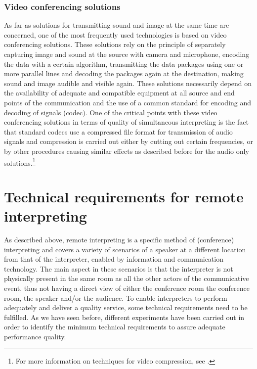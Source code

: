 \documentclass[output=paper]{langsci/langscibook}
\begin{document}
\subsubsection{Video conferencing solutions}
\label{sub:ziegler:4.4}
As far as solutions for transmitting sound and image at the same time are concerned, one of the most frequently used technologies is based on video conferencing solutions. These solutions rely on the principle of separately capturing image and sound at the source with camera and microphone, encoding the data with a certain algorithm, transmitting the data packages using one or more parallel lines and decoding the packages again at the destination, making sound and image audible and visible again. These solutions necessarily depend on the availability of adequate and compatible equipment at all source and end points of the communication and the use of a common standard for encoding and decoding of signals (codec). One of the critical points with these video conferencing solutions in terms of quality of simultaneous interpreting is the fact that standard codecs use a compressed file format for transmission of audio signals and compression is carried out either by cutting out certain frequencies, or by other procedures causing similar effects as described before for the audio only solutions.\footnote{For more information on techniques for video compression, see \citet{Wiegand2003}.}

\section{Technical requirements for remote interpreting}
\label{sec:ziegler:05}
As described above, remote interpreting is a specific method of (conference) interpreting and covers a variety of scenarios of a speaker at a different location from that of the interpreter, enabled by information and communication technology. The main aspect in these scenarios is that the interpreter is not physically present in the same room as all the other actors of the communicative event, thus not having a direct view of either the conference room the conference room, the speaker and/or the audience. To enable interpreters to perform adequately and deliver a quality service, some technical requirements need to be fulfilled. As we have seen before, different experiments have been carried out in order to identify the minimum technical requirements to assure adequate performance quality.
\end{document}
